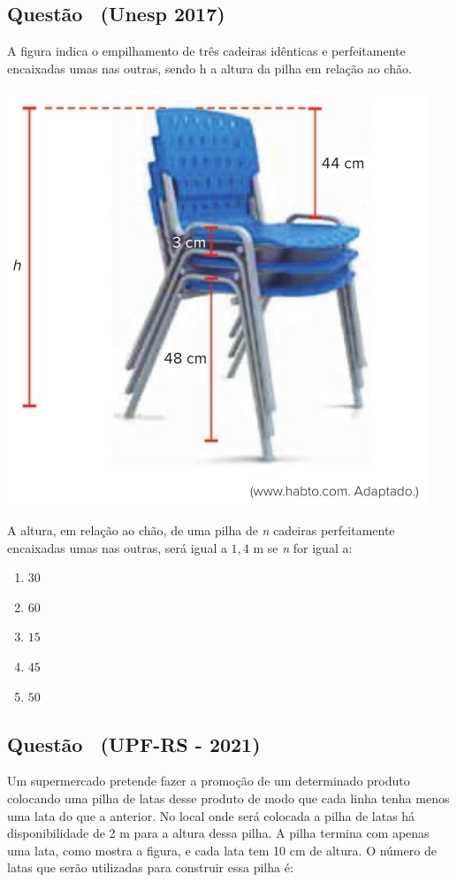 \documentclass[12pt]{article}
\newif\ifmostravermelho
\newcommand{\vermelho}[1]{%
  \ifmostravermelho
    {\color{red}#1}%
  \else
    #1%
  \fi
}
\newcounter{questao}
\newcommand{\novaquestao}[1]{%
  \stepcounter{questao}%
  \subsection*{Questão \thequestao\ (#1)}%
}
\begin{document}
\begin{multicols}{2}
        \novaquestao{Unesp 2017}
            A figura indica o empilhamento de três cadeiras idênticas e perfeitamente encaixadas umas nas outras, sendo h a altura da pilha em relação ao chão.

            \begin{center}
                \includegraphics[scale=0.5]{q35.png}
            \end{center} A altura, em relação ao chão, de uma pilha de \textit{n} cadeiras perfeitamente encaixadas umas nas outras, será igual a $1,4$ m se \textit{n} for igual a:
        
            \begin{enumerate}[label=(\alph*), noitemsep]
                \item \vermelho{$30$} %
                \item $60$ 
                \item $15$  
                \item $45$  
                \item $50$
            \end{enumerate}

        \novaquestao{UPF-RS - 2021}
            Um supermercado pretende fazer a promoção de um determinado produto colocando uma pilha de latas desse produto de modo que cada linha tenha menos uma lata do que a anterior. No local onde será colocada a pilha de latas há disponibilidade de 2 m para a altura dessa pilha. A pilha termina com apenas uma lata, como mostra a figura, e cada lata tem 10 cm de altura. O número de latas que serão utilizadas para construir essa pilha é:


\end{multicols}
\end{document}
